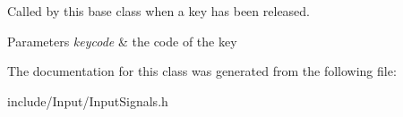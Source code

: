 Called by this base class when a key has been released.


\begin{DoxyParams}{Parameters}
{\em keycode} & the code of the key \\
\hline
\end{DoxyParams}


The documentation for this class was generated from the following file\+:\begin{DoxyCompactItemize}
\item 
include/\+Input/Input\+Signals.\+h\end{DoxyCompactItemize}
